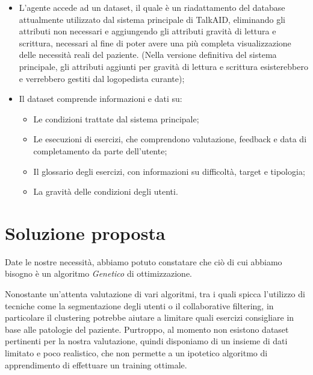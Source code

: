 \documentclass{article}
\begin{document}
    \begin{itemize}
        \item L'agente accede ad un dataset, il quale è un riadattamento del database attualmente utilizzato dal sistema principale di TalkAID, eliminando gli attributi non necessari e aggiungendo gli attributi gravità di lettura e scrittura, necessari al fine di poter avere una più completa visualizzazione delle necessità reali del paziente. (Nella versione definitiva del sistema principale, gli attributi aggiunti per gravità di lettura e scrittura esisterebbero e verrebbero gestiti dal logopedista curante);

        \item Il dataset comprende informazioni e dati su:
            \begin{itemize}
                \item Le condizioni trattate dal sistema principale;
                \item Le esecuzioni di esercizi, che comprendono valutazione, feedback e data di completamento da parte dell'utente;
                \item Il glossario degli esercizi, con informazioni su difficoltà, target e tipologia;
                \item La gravità delle condizioni degli utenti.
            \end{itemize}



    \end{itemize}

    \pagebreak

    \section{Soluzione proposta}

    Date le nostre necessità, abbiamo potuto constatare che ciò di cui abbiamo bisogno è un algoritmo \textit{Genetico} di ottimizzazione.

    Nonostante un'attenta valutazione di vari algoritmi, tra i quali spicca l'utilizzo di tecniche come la segmentazione degli utenti o il collaborative filtering, in particolare il clustering potrebbe aiutare a limitare quali esercizi consigliare in base alle patologie del paziente. Purtroppo, al momento non esistono dataset pertinenti per la nostra valutazione, quindi disponiamo di un insieme di dati limitato e poco realistico, che non permette a un ipotetico algoritmo di apprendimento di effettuare un training ottimale.
\end{document}
